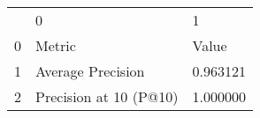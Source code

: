 \begin{tabular}{lll}
 & 0 & 1 \\
0 & Metric & Value \\
1 & Average Precision & 0.963121 \\
2 & Precision at 10 (P@10) & 1.000000 \\
\end{tabular}
